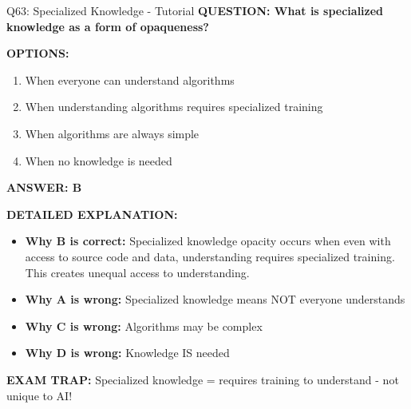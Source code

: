\documentclass[8pt]{beamer}
\begin{document}
	\begin{frame}{Q63: Specialized Knowledge - Tutorial}
		\fontsize{6.5}{7.5}\selectfont
		\textbf{QUESTION: What is specialized knowledge as a form of opaqueness?}
		
		\vspace{0.1cm}
		\textbf{OPTIONS:}
		\begin{enumerate}
			\item When everyone can understand algorithms
			\item When understanding algorithms requires specialized training
			\item When algorithms are always simple
			\item When no knowledge is needed
		\end{enumerate}
		
		\vspace{0.1cm}
		\textcolor{myblue}{\textbf{ANSWER: B}}
		
		\vspace{0.1cm}
		\textbf{DETAILED EXPLANATION:}
		\begin{itemize}
			\item \textbf{Why B is correct:} Specialized knowledge opacity occurs when even with access to source code and data, understanding requires specialized training. This creates unequal access to understanding.
			\item \textbf{Why A is wrong:} Specialized knowledge means NOT everyone understands
			\item \textbf{Why C is wrong:} Algorithms may be complex
			\item \textbf{Why D is wrong:} Knowledge IS needed
		\end{itemize}
		
		\textcolor{myred}{\textbf{EXAM TRAP:}} Specialized knowledge = \textcolor{myblue}{requires training to understand} - not unique to AI!
	\end{frame}
	
\end{document}
